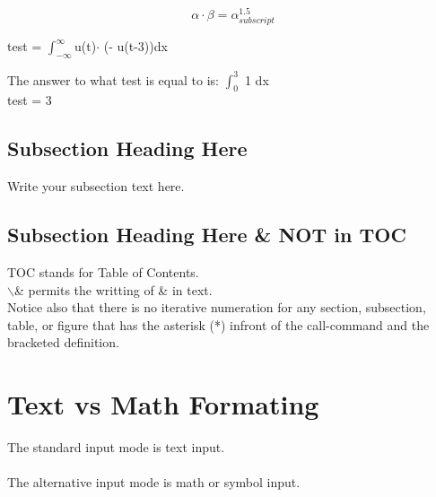 \documentclass{article}
\begin{document}
$$ \alpha \cdot \beta = \alpha^{1.5}_{subscript} $$		%

test = $\int^\infty_{-\infty} $u(t)$ \cdot$ (- u(t-3))$ $dx
\begin{center}
The answer to what test is equal to is: $\int^3_0$ 1 dx\\
test = 3
\end{center}

\subsection{Subsection Heading Here}
Write your subsection text here.


\subsection*{Subsection Heading Here \& NOT in TOC}

TOC stands for Table of Contents. \\

\noindent $\backslash$\& permits the writting of \& in text.\\
\indent Notice also that there is no iterative numeration for any section, subsection, table, or figure that has the asterisk (*) infront of the call-command and the bracketed definition.





\section{Text vs Math Formating}

The standard input mode is text input. \\
\hfill \\

The alternative input mode is math or symbol input. \\
\hfill \\
\end{document}
